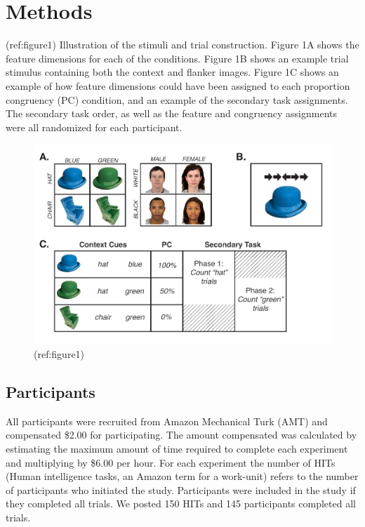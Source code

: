 \documentclass[english,,man,floatsintext]{apa6}
\begin{document}
\hypertarget{methods}{%
\section{Methods}\label{methods}}

(ref:figure1)
Illustration of the stimuli and trial construction. Figure 1A shows the feature dimensions for each of the conditions. Figure 1B shows an example trial stimulus containing both the context and flanker images. Figure 1C shows an example of how feature dimensions could have been assigned to each proportion congruency (PC) condition, and an example of the secondary task assignments. The secondary task order, as well as the feature and congruency assignments were all randomized for each participant.

\begin{figure}

{\centering \includegraphics[width=0.75\linewidth]{images/Task} 

}

\caption{(ref:figure1)}\label{fig:figure1}
\end{figure}

\hypertarget{participants}{%
\subsection{Participants}\label{participants}}

All participants were recruited from Amazon Mechanical Turk (AMT) and compensated \$2.00 for participating. The amount compensated was calculated by estimating the maximum amount of time required to complete each experiment and multiplying by \$6.00 per hour. For each experiment the number of HITs (Human intelligence tasks, an Amazon term for a work-unit) refers to the number of participants who initiated the study. Participants were included in the study if they completed all trials. We posted 150 HITs and 145 participants completed all trials.
\end{document}
